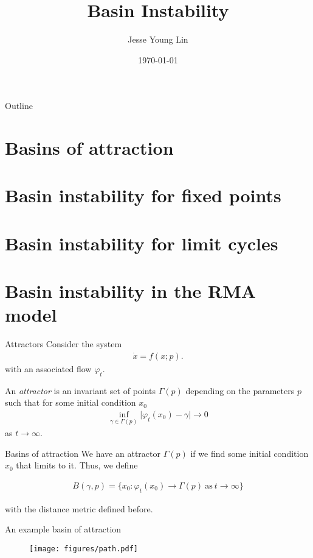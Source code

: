 \documentclass{beamer}
\title{Basin Instability}
\author{Jesse Young Lin}
\date{\today}
\begin{document}
\begin{frame}
	\titlepage
\end{frame}

\begin{frame}{Outline}
	\tableofcontents
\end{frame}

\section{Basins of attraction}
\section{Basin instability for fixed points}
\section{Basin instability for limit cycles}
\section{Basin instability in the RMA model}

\begin{frame}{Attractors}
	Consider the system
	\begin{align*}
		\dot x = f(x;p).
	\end{align*}
	with an associated flow $\varphi_{t}$.
	\vspace{0.5cm}
	\begin{definition}[Attractor]
		An \emph{attractor} is an invariant set of points $\Gamma(p)$ depending on the parameters
		$p$ such that for some initial condition $x_{0}$
		\begin{align*}
			\inf_{\gamma \in \Gamma(p)} \lvert \varphi_{t}(x_{0}) - \gamma \rvert \to 0
		\end{align*}
		as $t \to \infty$.
	\end{definition}

\end{frame}

\begin{frame}{Basins of attraction}
	We have an attractor $\Gamma(p)$ if we find some initial condition $x_{0}$
	that limits to it. Thus, we define
	\vspace{0.5cm}
	\begin{definition}
		\begin{align*}
			B(\gamma, p) = \{x_{0} : \varphi_{t}(x_{0}) \to \Gamma(p)\ \textrm{as}\ t \to \infty\}
		\end{align*}
	\end{definition}
	with the distance metric defined before.
\end{frame}

\begin{frame}{An example basin of attraction}
\begin{figure}[ht]
  \centering
  \texttt{[image: figures/path.pdf]}
  \caption{\label{fig:label} }
\end{figure}

\end{frame}
\end{document}
